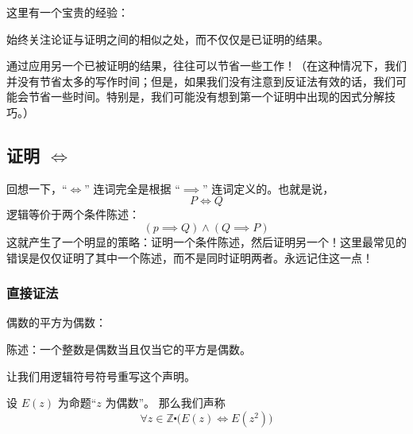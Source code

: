 这里有一个宝贵的经验：

\begin{center}
    始终关注论证与证明之间的相似之处，而不仅仅是已证明的结果。
\end{center}

通过应用另一个已被证明的结果，往往可以节省一些工作！（在这种情况下，我们并没有节省太多的写作时间；但是，如果我们没有注意到反证法有效的话，我们可能会节省一些时间。特别是，我们可能没有想到第一个证明中出现的因式分解技巧。）

\subsection{证明 $\iff$}\label{sec:section4.9.6}

回想一下，``$\iff$'' 连词完全是根据 ``$\implies$'' 连词定义的。也就是说，
\[P \iff Q\]
逻辑等价于两个条件陈述：
\[(p \implies Q) \land (Q \implies P)\]
这就产生了一个明显的策略：证明一个条件陈述，然后证明另一个！这里最常见的错误是仅仅证明了其中一个陈述，而不是同时证明两者。永远记住这一点！

\subsubsection*{直接证法}

\begin{center}
    \noindent {}
\end{center}

\begin{example}
    偶数的平方为偶数：

    陈述：一个整数是偶数当且仅当它的平方是偶数。

    让我们用逻辑符号符号重写这个声明。
    
    设 $E(z)$ 为命题``$z$ 为偶数''。 那么我们声称
    \[\forall z \in \mathbb{Z} \centerdot \Big(E(z) \iff E(z^2)\Big)\]
\end{example}

